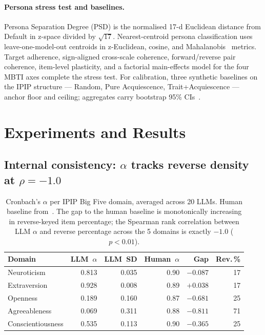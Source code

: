 \documentclass{article}
\begin{document}
\paragraph{Persona stress test and baselines.} Persona Separation Degree (PSD) is the normalised 17-d Euclidean distance from Default in z-space divided by $\sqrt{17}$. Nearest-centroid persona classification uses leave-one-model-out centroids in z-Euclidean, cosine, and Mahalanobis~\citep{mahalanobis1936generalised} metrics. Target adherence, sign-aligned cross-scale coherence, forward/reverse pair coherence, item-level plasticity, and a factorial main-effects model for the four MBTI axes complete the stress test. For calibration, three synthetic baselines on the IPIP structure --- Random, Pure Acquiescence, Trait+Acquiescence --- anchor floor and ceiling; aggregates carry bootstrap 95\% CIs~\citep{efron1979bootstrap}.


\section{Experiments and Results}
\label{sec:results}

\subsection{Internal consistency: $\alpha$ tracks reverse density at $\rho = -1.0$}
\label{sec:results-alpha}

\begin{table}[t]
\centering
\small
\begin{tabular}{lrrrrr}
\toprule
Domain & LLM~$\alpha$ & LLM~SD & Human~$\alpha$ & Gap & Rev.\,\% \\
\midrule
Neuroticism       & 0.813 & 0.035 & 0.90 & $-0.087$ & 17 \\
Extraversion      & 0.928 & 0.008 & 0.89 & $+0.038$ & 17 \\
Openness          & 0.189 & 0.160 & 0.87 & $-0.681$ & 25 \\
Agreeableness     & 0.069 & 0.311 & 0.88 & $-0.811$ & 71 \\
Conscientiousness & 0.535 & 0.113 & 0.90 & $-0.365$ & 25 \\
\bottomrule
\end{tabular}
\caption{Cronbach's $\alpha$ per IPIP Big Five domain, averaged across 20 LLMs. Human baseline from~\citet{johnson2014measuring}. The gap to the human baseline is monotonically increasing in reverse-keyed item percentage; the Spearman rank correlation between LLM $\alpha$ and reverse percentage across the 5 domains is exactly $-1.0$ ($p < 0.01$).}
\label{tab:alpha}
\end{table}
\end{document}
